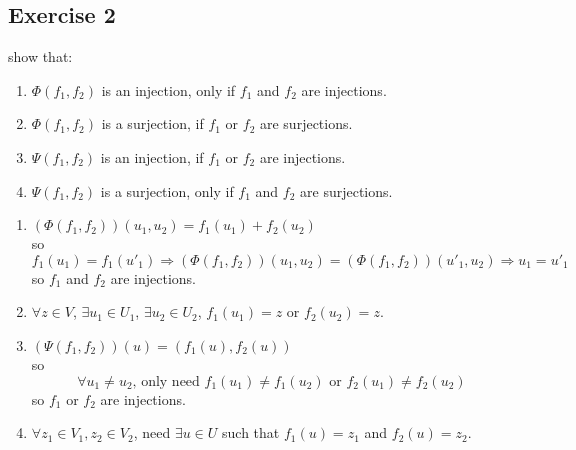 \documentclass[11pt]{ctexart}
\theoremstyle{definition}
\numberwithin{equation}{section}
\theoremstyle{definition}
\theoremstyle{remark}
\begin{document}
\subsection{Exercise 2}
show that:
\begin{enumerate}
    \item $\Phi(f_1,f_2)$ is an injection, only if $f_1$ and $f_2$ are injections.
    \item $\Phi(f_1,f_2)$ is a surjection, if $f_1$ or $f_2$ are surjections.
    \item $\Psi(f_1,f_2)$ is an injection, if $f_1$ or $f_2$ are injections.
    \item $\Psi(f_1,f_2)$ is a surjection, only if $f_1$ and $f_2$ are surjections.
\end{enumerate}
\begin{aaa}
    \begin{enumerate}
          \item $(\Phi(f_1,f_2))(u_1,u_2)=f_1(u_1)+f_2(u_2)$\\so $$f_1(u_1)=f_1(u'_1)\Rightarrow (\Phi(f_1,f_2))(u_1,u_2)=(\Phi(f_1,f_2))(u'_1,u_2)\Rightarrow u_1=u'_1$$ so $f_1$ and $f_2$ are injections.
          \item $\forall z\in V$, $\exists u_1\in U_1$, $\exists u_2\in U_2$, $f_1(u_1)=z$ or $f_2(u_2)=z$.
          \item $(\Psi(f_1,f_2))(u)=(f_1(u),f_2(u))$\\so $$\forall u_1 \neq u_2\text{, only need }f_1(u_1)\neq f_1(u_2) \text { or } f_2(u_1)\neq f_2(u_2)$$ so $f_1$ or $f_2$ are injections.
          \item $\forall z_1\in V_1,z_2 \in V_2$, need $\exists u \in U$ such that $f_1(u)=z_1$ and $f_2(u)=z_2$.
    \end{enumerate}
\end{aaa}
\end{document}
